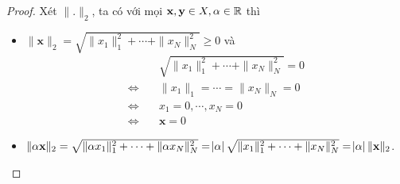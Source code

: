 \begin{proof}

Xét $\|\mathbf{.}\|_2$, ta có với mọi $\mathbf{x}, \mathbf{y} \in X, \alpha \in \mathbb R$ thì
\begin{itemize}
    \item $\|\mathbf{x}\|_2 = \sqrt{\|x_1\|_1^2 + \cdots + \|x_N\|_N^2} \geq 0$ và
    \begin{align*}
        &\quad\sqrt{\|x_1\|_1^2 + \cdots + \|x_N\|_N^2} = 0\\
        \Leftrightarrow&\quad \|x_1\|_1 = \cdots = \|x_N\|_N = 0\\
        \Leftrightarrow&\quad x_1 = 0, \cdots, x_N = 0\\
        \Leftrightarrow&\quad \mathbf{x} = 0
    \end{align*}
    \item $\|\mathbf{\alpha x}\|_2 = \sqrt{\|\alpha x_1\|_1^2+\cdots+\|\alpha x_N\|_N^2} = \abs{\alpha} \sqrt{\|x_1\|_1^2 + \cdots + \|x_N\|_N^2} = \abs{\alpha} \|\mathbf{x}\|_2$.
    

\end{itemize}
\end{proof}
